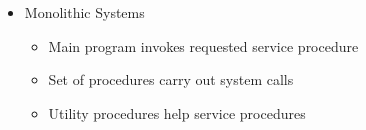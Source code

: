 \documentclass{report}
\begin{document}
\begin{description}
\begin{itemize}
\begin{itemize}
                    \item Monolithic Systems
                        \begin{itemize}
                            \item Main program invokes requested service procedure
                            \item Set of procedures carry out system calls
                            \item Utility procedures help service procedures
                        \end{itemize}
                \end{itemize}
        \end{itemize}
\end{description}
\end{document}
